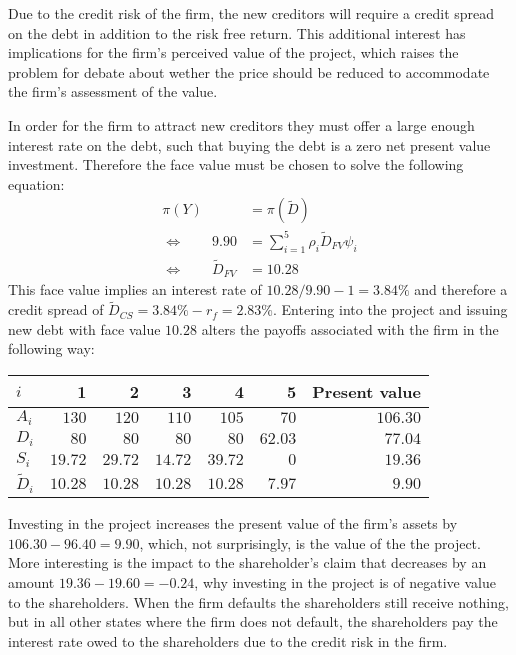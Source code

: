 \documentclass[../main.tex]{subfiles}
\begin{document}
        Due to the credit risk of the firm, the new creditors will require a credit spread on the debt in addition to the risk free return. This additional interest has implications for the firm's perceived value of the project, which raises the problem for debate about wether the price should be reduced to accommodate the firm's assessment of the value.

        In order for the firm to attract new creditors they must offer a large enough interest rate on the debt, such that buying the debt is a zero net present value investment. Therefore the face value must be chosen to solve the following equation:
            \begin{align}
                \pi(Y) &= \pi(\tilde{D}) \\
                \Leftrightarrow  \qquad
                9.90 &= \sum_{i=1}^{5} \rho_{i}\tilde{D}_{FV}\psi_{i} \\
                \Leftrightarrow  \qquad
                \tilde{D}_{FV} &= 10.28
            \end{align}
        This face value implies an interest rate of $10.28 / 9.90 - 1 = 3.84\%$ and therefore a credit spread of $\tilde{D}_{CS} = 3.84\% - r_{f} = 2.83\%$. Entering into the project and issuing new debt with face value $10.28$ alters the payoffs associated with the firm in the following way:
        \begin{table}[H]
            \centering
            \begin{tabular}{l|rrrrr||r}
                $i$ & 1 & 2 & 3 & 4 & 5 & Present value \\
                \hline
                $A_{i}$ & $130$ & $120$ & $110$ & $105$ & $70$ & $106.30$ \\
                $D_{i}$ & $80$ & $80$ & $80$ & $80$ & $62.03$ & $77.04$ \\
                $S_{i}$ & $19.72$ & $29.72$ & $14.72$ & $39.72$ & $0$ & $19.36$ \\
                $\tilde{D}_{i}$ & $10.28$ & $10.28$ & $10.28$ & $10.28$ & $7.97$ & $9.90$ \\
            \end{tabular}
        \end{table}

        Investing in the project increases the present value of the firm's assets by $106.30 - 96.40 = 9.90$, which, not surprisingly, is the value of the the project. More interesting is the impact to the shareholder's claim that decreases by an amount $19.36 - 19.60 = -0.24$, why investing in the project is of negative value to the shareholders. When the firm defaults the shareholders still receive nothing, but in all other states where the firm does not default, the shareholders pay the interest rate owed to the shareholders due to the credit risk in the firm.
\end{document}
